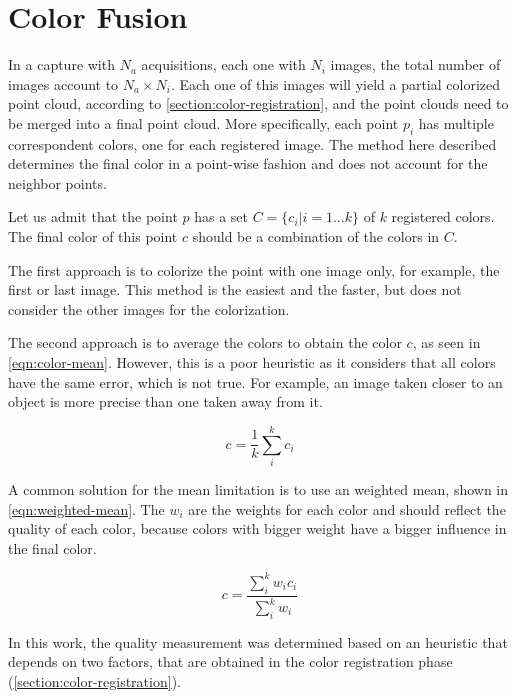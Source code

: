 \section{Color Fusion}
\label{section:color-fusion}

In a capture with $N_a$ acquisitions, each one with $N_i$ images, the total number of images account to $N_a \times N_i$. Each one of this images will yield a partial colorized point cloud, according to \cref{section:color-registration}, and the point clouds need to be merged into a final point cloud. More specifically, each point $p_i$ has multiple correspondent colors, one for each registered image. The method here described determines the final color in a point-wise fashion and does not account for the neighbor points.

Let us admit that the point $p$ has a set $C = \{c_i|i=1\dots k\}$ of $k$ registered colors. The final color of this point $c$ should be a combination of the colors in $C$. 

The first approach is to colorize the point with one image only, for example, the first or last image. This method is the easiest and the faster, but does not consider the other images for the colorization. 

The second approach is to average the colors to obtain the color $c$, as seen in \cref{eqn:color-mean}. However, this is a poor heuristic as it considers that all colors have the same error, which is not true. For example, an image taken closer to an object is more precise than one taken away from it. 

\begin{equation}
    \label{eqn:color-mean}
    c = \frac{1}{k} \sum_{i}^{k}{c_i}
\end{equation}

A common solution for the mean limitation is to use an weighted mean, shown in \cref{eqn:weighted-mean}. The $w_i$ are the weights for each color and should reflect the quality of each color, because colors with bigger weight have a bigger influence in the final color.

\begin{equation}
    \label{eqn:weighted-mean}
    c = \frac{\sum_{i}^{k}{w_i c_i}}{\sum_{i}^{k}{w_i}}
\end{equation}

In this work, the quality measurement was determined based on an heuristic that depends on two factors, that are obtained in the color registration phase (\cref{section:color-registration}).


